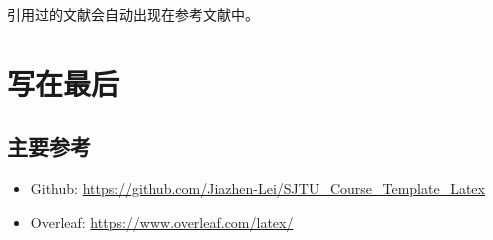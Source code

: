 \documentclass[12pt,hyperref,a4paper,UTF8]{ctexart}
\begin{document}
引用过的文献会自动出现在参考文献中\cite{Fan2022}。

\section{写在最后}
\subsection{主要参考}
\begin{itemize}
    \item Github: \url{https://github.com/Jiazhen-Lei/SJTU_Course_Template_Latex}
    \item Overleaf:  \url{https://www.overleaf.com/latex/}
\end{itemize}


\end{document}
